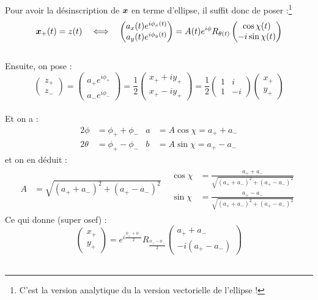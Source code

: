 Pour avoir la désinscription de $\bf{x}$ en terme d’ellipse, il suffit donc de poser :\footnote{C'est la version analytique du la version vectorielle de l'ellipse !}
\[\sa{\bf{x}}(t) = z(t)\quad \Llr\quad \begin{pmatrix}a_x(t) e^{i\phi_x(t)} \\ a_y(t) e^ {i\phi_y(t)}\end{pmatrix} = A(t)e^{i\phi} R_{\theta(t)} \begin{pmatrix} \cos\chi(t) \\ -i\sin\chi(t) \end{pmatrix}\]
\\
Ensuite, on pose :
\[\begin{pmatrix}z_+ \\ z_-\end{pmatrix} = \begin{pmatrix}a_+ e^{i\phi_+} \\ a_- e^{i\phi_-}\end{pmatrix} = \frac{1}{2}\begin{pmatrix}x_+ + iy_+ \\ x_+ - iy_+\end{pmatrix} = \frac{1}{2}\begin{pmatrix}1 & i \\ 1 & -i\end{pmatrix} \begin{pmatrix}x_+ \\ y_+\end{pmatrix}\]
\\
Et on a :
\begin{align*}
	2\phi &= \phi_+ + \phi_-  &  a &= A\cos\chi = a_+ + a_- \\
	2\theta &= \phi_+ - \phi_-  &  b &= A\sin\chi = a_+ - a_- 
\end{align*}
et on en déduit :
\begin{align*}
	A &= \sqrt{(a_+ + a_-)^2 + (a_+ - a_-)^2}  &  \begin{aligned} \cos\chi &= \frac{a_+ + a_- }{\sqrt{(a_+ + a_-)^2 + (a_+ - a_-)^2}}  \\  \sin\chi &= \frac{a_+ - a_- }{\sqrt{(a_+ + a_-)^2 + (a_+ - a_-)^2}}	\end{aligned}
\end{align*}
Ce qui donne \infine (super osef) :
\[\begin{pmatrix}x_+ \\ y_+\end{pmatrix} = e^{i\frac{\phi_+ + \phi_-}{2}} R_{\frac{\phi_+ - \phi_-}{2}} \begin{pmatrix}a_+ + a_- \\ -i(a_+ - a_-)\end{pmatrix}\]
\\

